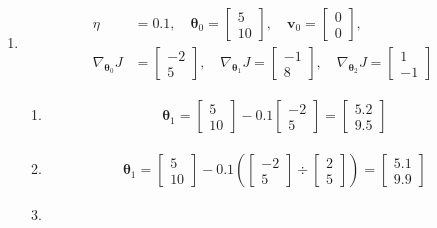 \documentclass{dlproblemset}
\begin{document}
\begin{enumerate}[1)]
    \item
    \begin{align*}
    \eta &= 0.1, \quad \boldsymbol{\theta}_{0} =
      \begin{bmatrix}
        5 \\
        10
      \end{bmatrix},
      \quad \mathbf{v}_{0} =
      \begin{bmatrix}
        0 \\
        0
      \end{bmatrix},
    \\
    \nabla_{\boldsymbol{\theta}_{0}} J &=
      \begin{bmatrix}
        -2 \\
        5
      \end{bmatrix},
      \quad
      \nabla_{\boldsymbol{\theta}_{1}} J =
      \begin{bmatrix}
        -1 \\
        8
      \end{bmatrix},
      \quad
      \nabla_{\boldsymbol{\theta}_{2}} J =
      \begin{bmatrix}
        1 \\
        -1
      \end{bmatrix}
    \end{align*}
    \begin{enumerate}
        \item
        \begin{align*}
            \boldsymbol{\theta}_{1} =
      \begin{bmatrix}
        5 \\
        10
      \end{bmatrix} -0.1\begin{bmatrix}
        -2 \\
        5
      \end{bmatrix} = \begin{bmatrix}
        5.2 \\
        9.5
      \end{bmatrix}
        \end{align*}

        \item
                \begin{align*}
            \boldsymbol{\theta}_{1} =
      \begin{bmatrix}
        5 \\
        10
      \end{bmatrix} -0.1\left (\begin{bmatrix}
        -2 \\
        5
      \end{bmatrix}\div\begin{bmatrix}
        2 \\
        5
      \end{bmatrix}\right) = \begin{bmatrix}
        5.1 \\
        9.9
      \end{bmatrix}
        \end{align*}
        \item


\end{enumerate}
\end{enumerate}
\end{document}
